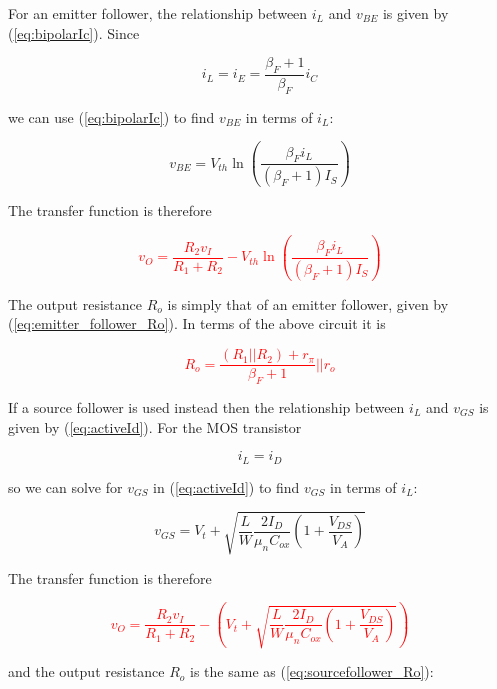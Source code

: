 For an emitter follower, the relationship between $i_{L}$ and $v_{BE}$ is given by (\ref{eq:bipolarIc}). Since

\begin{equation}
i_{L} = i_{E} = \frac{\beta_{F}+1}{\beta_{F}}i_{C}
\end{equation}

we can use (\ref{eq:bipolarIc}) to find $v_{BE}$ in terms of $i_{L}$:

\begin{equation}
v_{BE} = V_{th}\ln\left(\frac{\beta_{F}i_{L}}{(\beta_{F}+1)I_{S}}\right)
\end{equation}

The transfer function is therefore

\textcolor{red}{
\begin{equation}
v_{O} = \frac{R_2 v_{I}}{R_1 + R_2} - V_{th}\ln\left(\frac{\beta_{F}i_{L}}{(\beta_{F}+1)I_{S}}\right)
\end{equation}
}

The output resistance $R_{o}$ is simply that of an emitter follower, given by (\ref{eq:emitter_follower_Ro}).
In terms of the above circuit it is

\textcolor{red}{
\begin{equation}
R_{o} = \frac{(R_{1}||R_{2})+r_{\pi}}{\beta_{F}+1}||r_{o}
\end{equation}
}

If a source follower is used instead then the relationship between $i_{L}$ and $v_{GS}$ is given by (\ref{eq:activeId}).
For the MOS transistor

\begin{equation}
i_{L} = i_{D}
\end{equation}

so we can solve for $v_{GS}$ in (\ref{eq:activeId}) to find $v_{GS}$ in terms of $i_{L}$:

\begin{equation}
v_{GS} = V_{t} + \sqrt{\frac{L}{W}\frac{2I_{D}}{\mu_{n}C_{ox}}\left(1+\frac{V_{DS}}{V_{A}}\right)}
\end{equation}

The transfer function is therefore

\textcolor{red}{
\begin{equation}
v_{O} = \frac{R_{2}v_{I}}{R_{1}+R_{2}} - \left(V_{t} + \sqrt{\frac{L}{W}\frac{2I_{D}}{\mu_{n}C_{ox}}\left(1+\frac{V_{DS}}{V_{A}}\right)}\right)
\end{equation}
}

and the output resistance $R_{o}$ is the same as (\ref{eq:sourcefollower_Ro}):


